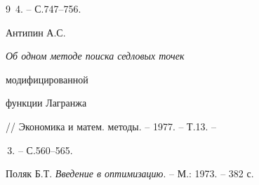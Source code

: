 \begin{thebibliography}{9}
\No\,4. -- С.747--756.




Антипин А.С. {\em Об одном методе поиска седловых точек


модифицированной


функции Лагранжа} // Экономика и матем. методы. -- 1977. -- Т.13. --


\No\,3. -- С.560--565.




Поляк Б.Т. {\em Введение в оптимизацию}. -- М.: 1973. -- 382 с.





\end{thebibliography}





\vskip 2cm
















